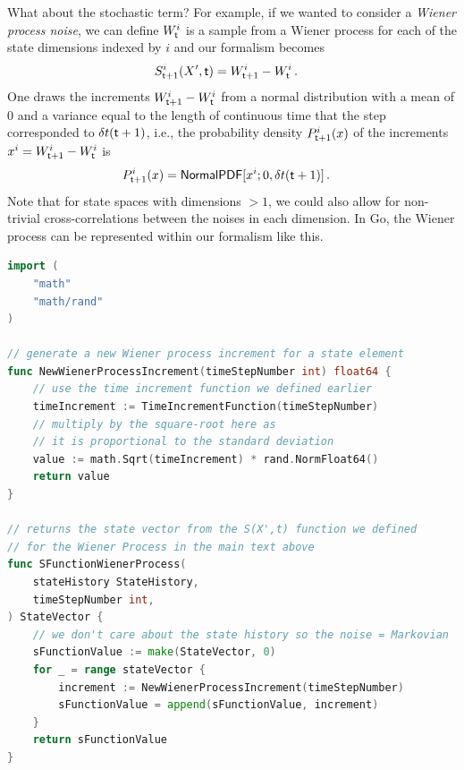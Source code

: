 \documentclass{book}
\begin{document}
What about the stochastic term? For example, if we wanted to consider a \emph{Wiener process noise}, we can define $W^i_{{\sf t}}$ is a sample from a Wiener process for each of the state dimensions indexed by $i$ and our formalism becomes
\begin{align}
& S^{i}_{{\sf t}+1}(X',{\sf t}) = W^i_{{\sf t}+1}-W^i_{\sf t} \label{eq:wiener}\,.
\end{align}
One draws the increments $W^i_{{\sf t}+1}-W^i_{\sf t}$ from a normal distribution with a mean of $0$ and a variance equal to the length of continuous time that the step corresponded to $\delta t({\sf t}+1)$, i.e., the probability density $P^i_{{\sf t}+1}(x)$ of the increments $x^i=W^i_{{\sf t}+1}-W^i_{\sf t}$ is
\begin{align}
P^i_{{\sf t}+1}(x) &= {\sf NormalPDF}[x^i;0,\delta t({\sf t}+1)] \,.
\end{align}
Note that for state spaces with dimensions $>1$, we could also allow for non-trivial cross-correlations between the noises in each dimension. In Go, the Wiener process can be represented within our formalism like this.

\begin{lstlisting}[language=Go]
import (
    "math"
    "math/rand"
)

// generate a new Wiener process increment for a state element
func NewWienerProcessIncrement(timeStepNumber int) float64 {
    // use the time increment function we defined earlier
    timeIncrement := TimeIncrementFunction(timeStepNumber)
    // multiply by the square-root here as 
    // it is proportional to the standard deviation
    value := math.Sqrt(timeIncrement) * rand.NormFloat64()
    return value
}

// returns the state vector from the S(X',t) function we defined 
// for the Wiener Process in the main text above
func SFunctionWienerProcess(
    stateHistory StateHistory, 
    timeStepNumber int,
) StateVector {
    // we don't care about the state history so the noise = Markovian
    sFunctionValue := make(StateVector, 0)
    for _ = range stateVector {
        increment := NewWienerProcessIncrement(timeStepNumber)
        sFunctionValue = append(sFunctionValue, increment)
    }
    return sFunctionValue
}
\end{lstlisting}
\end{document}
